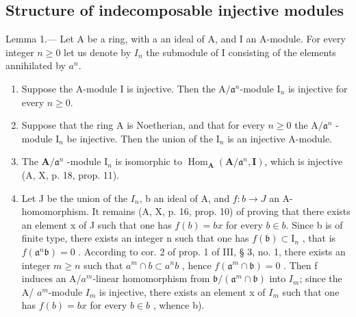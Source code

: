 \subsection{Structure of indecomposable injective modules}

Lemma 1.--- Let A be a ring, with a an ideal of A, and I an A-module. For every integer \(n \geqslant 0\) let us denote by \(I_{n}\) the submodule of I consisting of the elements annihilated by \(a^{n}\).

\begin{enumerate}
\def\labelenumi{\alph{enumi})}
\item
  Suppose the A-module I is injective. Then the \(\mathrm{A} / \mathfrak{a}^n\)-module \(\mathrm{I}_n\) is injective for every \(n \geqslant 0\).
\item
  Suppose that the ring A is Noetherian, and that for every \(n \geqslant 0\) the \(\mathrm{A} / \mathfrak{a}^n\) -module \(\mathrm{I}_n\) be injective. Then the union of the \(\mathrm{I}_n\) is an injective A-module.
\item
  The \(\mathbf{A} / \mathfrak{a}^n\) -module \(\mathrm{I}_n\) is isomorphic to \(\operatorname{Hom}_{\mathbf{A}}(\mathbf{A} / \mathfrak{a}^n, \mathbf{I})\), which is injective (A, X, p. 18, prop. 11).
\item
  Let J be the union of the \(I_{n}\), b an ideal of A, and \(f : b \to J\) an A-homomorphism. It remains (A, X, p. 16, prop. 10) of proving that there exists an element x of J such that one has \(f(b) = bx\) for every \(b \in b\). Since b is of finite type, there exists an integer n such that one has \(f(\mathfrak{b}) \subset \mathrm{I}_{n}\) , that is \(f(\mathfrak{a}^{n}\mathfrak{b}) = 0\) . According to cor. 2 of prop. 1 of III, § 3, no. 1, there exists an integer \(m \geqslant n\) such that \(a^{m} \cap b \subset a^{n}b\) , hence \(f(\mathfrak{a}^{m} \cap \mathfrak{b}) = 0\) . Then f induces an A/\(a^{m}\)-linear homomorphism from \(\mathfrak{b}/(\mathfrak{a}^{m} \cap \mathfrak{b})\) into \(I_{m}\); since the A/ \(a^{m}\)-module \(I_{m}\) is injective, there exists an element x of \(I_{m}\) such that one has \(f(b) = bx\) for every \(b \in b\) , whence b).
\end{enumerate}

